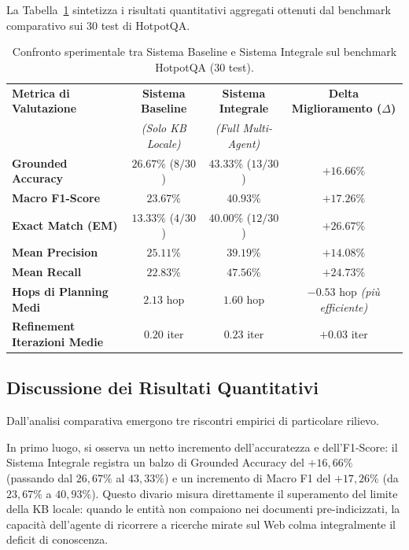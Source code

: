 La Tabella~\ref{tab:risultati_benchmark} sintetizza i risultati quantitativi aggregati ottenuti dal benchmark comparativo sui 30 test di HotpotQA.

\begin{table}[htbp]
\centering
\small
\begin{tabularx}{\textwidth}{l c c c}
\toprule
\textbf{Metrica di Valutazione} & \textbf{Sistema Baseline} & \textbf{Sistema Integrale} & \textbf{Delta Miglioramento ($\Delta$)} \\
& \textit{(Solo KB Locale)} & \textit{(Full Multi-Agent)} & \\
\midrule
\textbf{Grounded Accuracy} & $26.67\%$ ($8/30$) & $\mathbf{43.33\%}$ ($13/30$) & $\mathbf{+16.66\%}$ \\
\textbf{Macro F1-Score} & $23.67\%$ & $\mathbf{40.93\%}$ & $\mathbf{+17.26\%}$ \\
\textbf{Exact Match (EM)} & $13.33\%$ ($4/30$) & $\mathbf{40.00\%}$ ($12/30$) & $\mathbf{+26.67\%}$ \\
\textbf{Mean Precision} & $25.11\%$ & $\mathbf{39.19\%}$ & $\mathbf{+14.08\%}$ \\
\textbf{Mean Recall} & $22.83\%$ & $\mathbf{47.56\%}$ & $\mathbf{+24.73\%}$ \\
\midrule
\textbf{Hops di Planning Medi} & $2.13$ hop & $\mathbf{1.60}$ hop & $\mathbf{-0.53}$ hop \textit{(più efficiente)} \\
\textbf{Refinement Iterazioni Medie} & $0.20$ iter & $0.23$ iter & $+0.03$ iter \\
\bottomrule
\end{tabularx}
\caption{Confronto sperimentale tra Sistema Baseline e Sistema Integrale sul benchmark HotpotQA (30 test).}
\label{tab:risultati_benchmark}
\end{table}

\subsection{Discussione dei Risultati Quantitativi}
Dall'analisi comparativa emergono tre riscontri empirici di particolare rilievo.

In primo luogo, si osserva un netto incremento dell'accuratezza e dell'F1-Score: il Sistema Integrale registra un balzo di Grounded Accuracy del $+16,66\%$ (passando dal $26,67\%$ al $43,33\%$) e un incremento di Macro F1 del $+17,26\%$ (da $23,67\%$ a $40,93\%$). Questo divario misura direttamente il superamento del limite della KB locale: quando le entità non compaiono nei documenti pre-indicizzati, la capacità dell'agente di ricorrere a ricerche mirate sul Web colma integralmente il deficit di conoscenza.

